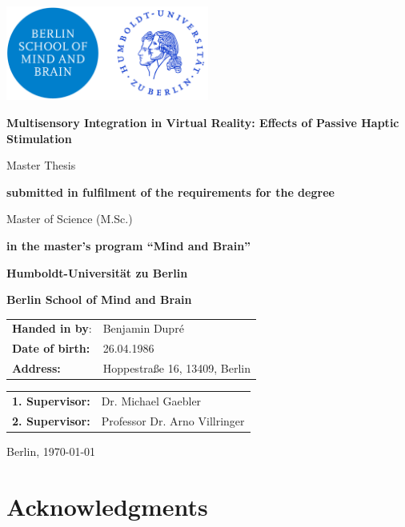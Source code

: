\documentclass[12pt,oneside,openright]{report}
\begin{document}
\begin{titlepage}
    \centering
    \includegraphics[width=0.5\textwidth]{Hu-logo.png}
    \vspace{2cm}
    
    {\huge \textbf{Multisensory Integration in Virtual Reality: Effects of Passive Haptic Stimulation}\par}
    \vspace{2cm}
    {\LARGE Master Thesis\par}
    \vspace{0.5cm}
    {\textbf{submitted in fulfilment of the requirements for the degree}\par}
    Master of Science (M.Sc.)\par
    {\textbf{in the master's program ``Mind and Brain''}\par}
    \vspace{1.5cm}
    {\textbf{Humboldt-Universität zu Berlin}\par}
    {\textbf{Berlin School of Mind and Brain}\par}
    \vfill
    \raggedright
    \begin{tabular}{ll}
        \textbf{Handed in by}: & Benjamin Dupré \\
        \textbf{Date of birth:} & 26.04.1986\\
       \textbf{ Address:} & Hoppestraße 16, 13409, Berlin \\
    \end{tabular}
    \vfill
    \begin{tabular}{ll}
        \textbf{1. Supervisor:}& Dr. Michael Gaebler \\
        \textbf{2. Supervisor:}& Professor Dr. Arno Villringer  \\
    \end{tabular}
    \vfill
    {Berlin, \today \par}
\end{titlepage}

\newpage
\section*{\centering Acknowledgments}
\end{document}
